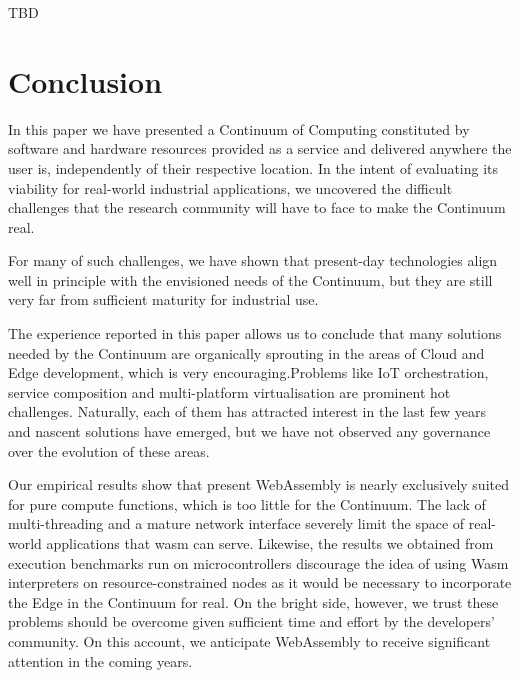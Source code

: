 TBD

\section{Conclusion}
\label{sec:conclusion}

In this paper we have presented a Continuum of Computing constituted by software and hardware resources provided as a service and delivered anywhere the user is, independently of their respective location. 
In the intent of evaluating its viability for real-world industrial applications, we uncovered the difficult challenges that the research community will have to face to make the Continuum real. 

For many of such challenges, we have shown that present-day technologies align well in principle with the envisioned needs of the Continuum, but they are still very far from sufficient maturity for industrial use.


The experience reported in this paper allows us to conclude that many solutions needed by the Continuum are organically sprouting in the areas of Cloud and Edge development, which is very encouraging.Problems like IoT orchestration, service composition and multi-platform virtualisation are prominent hot challenges. Naturally, each of them has attracted interest in the last few years and nascent solutions have emerged, but we have not observed any governance over the evolution of these areas.

Our empirical results show that present WebAssembly is nearly exclusively suited for pure compute functions, which is too little for the Continuum. The lack of multi-threading and a mature network interface severely limit the space of real-world applications that wasm can serve.
Likewise, the results we obtained from execution benchmarks run on microcontrollers discourage the idea of using Wasm interpreters on resource-constrained nodes as it would be necessary to incorporate the Edge in the Continuum for real. 
On the bright side, however, we trust these problems should be overcome given sufficient time and effort by the developers' community. On this account, we anticipate WebAssembly to receive significant attention in the coming years.

